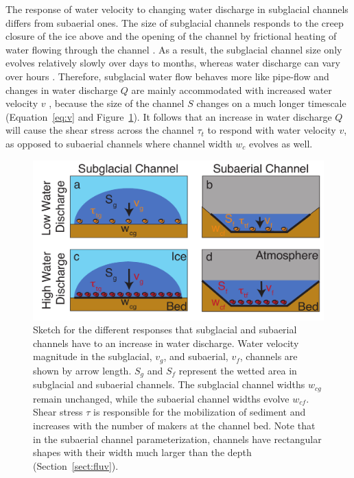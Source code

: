 \documentclass[11pt]{article}
\newcommand{\ian}[1]{{\textbf{\color{blue}Ian says:} \color{blue} #1} }
\begin{document}
The response of water velocity to changing water discharge in subglacial channels differs from subaerial ones.
The size of subglacial channels responds to the creep closure of the ice above and the opening of the channel by frictional heating of water flowing through the channel \citep{rothlisberger1972}.
As a result, the subglacial channel size only evolves relatively slowly over days to months, whereas water discharge can vary over hours \citep[e.g.][]{iken1986,andrews2014,nanni2020}.
Therefore, subglacial water flow behaves more like pipe-flow and changes in water discharge $Q$ are mainly accommodated with increased water velocity $v$ \citep[e.g.][]{swift2005}, because the size of the channel $S$ changes on a much longer timescale (Equation~\ref{eq:v} and Figure~\ref{fig:cartoon}).
It follows that an increase in water discharge $Q$ will cause the shear stress across the channel $\tau_t$ to respond with water velocity $v$, as opposed to subaerial channels where channel width $w_c$ evolves as well.

  \begin{figure}[h]
  \centering
    \includegraphics[width=0.8\linewidth]{Fig1.pdf}
    \caption{Sketch for the different responses that subglacial and subaerial channels have to an increase in water discharge.  Water velocity magnitude in the subglacial, $v_g$, and subaerial, $v_f$, channels are shown by arrow length. $S_g$ and $S_f$ represent the wetted area in subglacial and subaerial channels. The subglacial channel widths $w_{cg}$ remain unchanged, while the subaerial channel widths evolve $w_{cf}$. Shear stress $\tau$ is responsible for the mobilization of sediment and increases with the number of makers at the channel bed.
      Note that in the subaerial channel parameterization, channels have rectangular shapes with their width much larger than the depth (Section~\ref{sect:fluv}).}
    \label{fig:cartoon}
  \end{figure}
\end{document}
